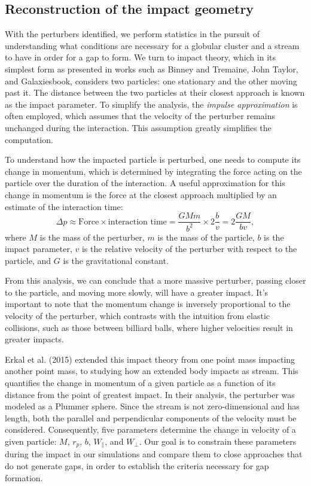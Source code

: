\documentclass[draft]{aa}
\begin{document}
  \subsection{Reconstruction of the impact geometry}
    
    With the perturbers identified, we perform statistics in the pursuit of understanding what conditions are necessary for a globular cluster and a stream to have in order for a gap to form. We turn to impact theory, which in its simplest form as presented in works such as Binney and Tremaine, John Taylor, and Galaxiesbook, considers two particles: one stationary and the other moving past it. The distance between the two particles at their closest approach is known as the impact parameter. To simplify the analysis, the \textit{impulse approximation} is often employed, which assumes that the velocity of the perturber remains unchanged during the interaction. This assumption greatly simplifies the computation.

    To understand how the impacted particle is perturbed, one needs to compute its change in momentum, which is determined by integrating the force acting on the particle over the duration of the interaction. A useful approximation for this change in momentum is the force at the closest approach multiplied by an estimate of the interaction time:
    \begin{equation} 
      \Delta p \approx \text{Force} \times \text{interaction time} = \frac{GMm}{b^2} \times 2\frac{b}{v} = 2\frac{GM}{bv}, 
      \end{equation} \label{eq:change_in_momentum}
    where $M$ is the mass of the perturber, $m$ is the mass of the particle, $b$ is the impact parameter, $v$ is the relative velocity of the perturber with respect to the particle, and $G$ is the gravitational constant.

    From this analysis, we can conclude that a more massive perturber, passing closer to the particle, and moving more slowly, will have a greater impact. It's important to note that the momentum change is inversely proportional to the velocity of the perturber, which contrasts with the intuition from elastic collisions, such as those between billiard balls, where higher velocities result in greater impacts.

    Erkal et al. (2015) extended this impact theory from one point mass impacting another point mass, to studying how an extended body impacts as stream. This quantifies the change in momentum of a given particle as a function of its distance from the point of greatest impact. In their analysis, the perturber was modeled as a Plummer sphere. Since the stream is not zero-dimensional and has length, both the parallel and perpendicular components of the velocity must be considered. Consequently, five parameters determine the change in velocity of a given particle: $M$, $r_p$, $b$, $W_\parallel$, and $W_\perp$. Our goal is to constrain these parameters during the impact in our simulations and compare them to close approaches that do not generate gaps, in order to establish the criteria necessary for gap formation.
\end{document}
